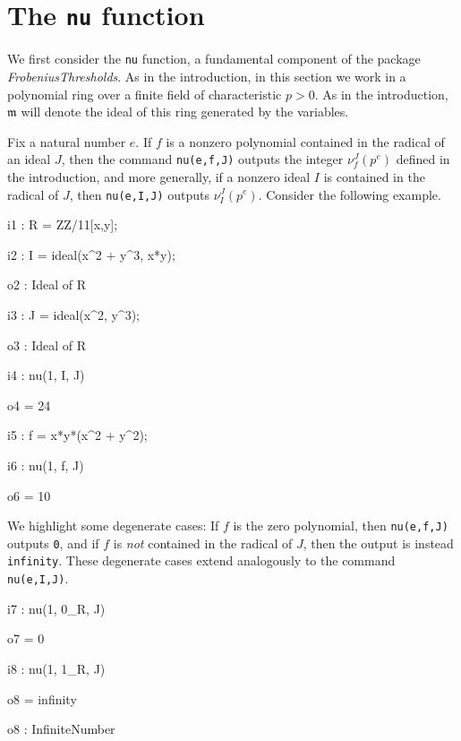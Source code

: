 \documentclass{amsart}
\newcommand{\idealm}{\mathfrak{m}}
\begin{document}
\section{The {\tt nu} function}
\label{sec.Nu}


We first consider the {\tt nu} function, a fundamental component of the package \emph{FrobeniusThresholds}.   As in the introduction, in this section we work in a polynomial ring over a finite field of characteristic $p>0$.  As in the introduction, $\idealm$ will denote the ideal of this ring generated by the variables.

Fix a natural number $e$.  If $f$ is a nonzero polynomial contained in the radical of an ideal $J$, then the command {\tt nu(e,f,J)} outputs the integer $\nu_f^J(p^e)$ defined in the introduction, and
more generally, if a nonzero ideal $I$ is contained in the radical of $J$, then {\tt nu(e,I,J)} outputs $\nu_I^J(p^e)$. Consider the following example.  %

{\small
{}
\begin{MyVerbatim}

i1 : R = ZZ/11[x,y];

i2 : I = ideal(x^2 + y^3, x*y);

o2 : Ideal of R

i3 : J = ideal(x^2, y^3);

o3 : Ideal of R

i4 : nu(1, I, J)

o4 = 24

i5 : f = x*y*(x^2 + y^2);

i6 : nu(1, f, J)

o6 = 10
\end{MyVerbatim}
}
\medspace


We highlight some degenerate cases:  If $f$ is the zero polynomial, then {\tt nu(e,f,J)} outputs {\tt 0}, and if $f$ is \emph{not} contained in the radical of $J$, then the output is instead {\tt infinity}.  These degenerate cases extend analogously to the command {\tt nu(e,I,J)}.

{\small
{}
\begin{MyVerbatim}

i7 : nu(1, 0_R, J)

o7 = 0

i8 : nu(1, 1_R, J)

o8 = infinity

o8 : InfiniteNumber
\end{MyVerbatim}
}
\medspace
\end{document}

